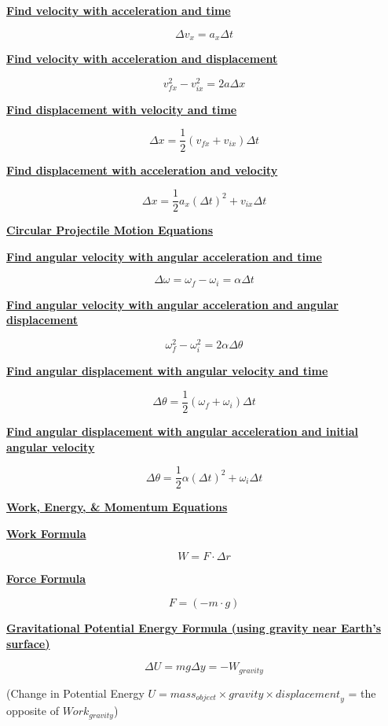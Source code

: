 \documentclass[12pt, letterpaper]{article}
\begin{document}
\normalsize{\centerline{\textbf{\underline{Find velocity with acceleration and time}}}}
\[\Delta v_x = a_x \Delta t\]

\centerline{\textbf{\underline{Find velocity with acceleration and displacement}}}
\[v^2_{fx} - v^2_{ix} = 2a \Delta x\]

\centerline{\textbf{\underline{Find displacement with velocity and time}}}
\[\Delta x = \frac{1}{2} (v_{fx} + v_{ix}) \Delta t\]

\centerline{\textbf{\underline{Find displacement with acceleration and velocity}}}
\[\Delta x = \frac{1}{2} a_x (\Delta t)^2 + v_{ix} \Delta t\]

\newpage

\Large{\centerline{\textbf{\underline{Circular Projectile Motion Equations}}}}
\vspace{1em}

\normalsize{\centerline{\textbf{\underline{Find angular velocity with angular acceleration and time}}}}
\[\Delta \omega = \omega_f - \omega_i = \alpha \Delta t\]

\centerline{\textbf{\underline{Find angular velocity with angular acceleration and angular displacement}}}
\[\omega^2_{f} - \omega^2_{i} = 2 \alpha \Delta \theta \]

\centerline{\textbf{\underline{Find angular displacement with angular velocity and time}}}
\[\Delta \theta = \frac{1}{2} (\omega_{f} + \omega_{i}) \Delta t\]

\centerline{\textbf{\underline{Find angular displacement with angular acceleration and initial angular velocity}}}
\[\Delta \theta = \frac{1}{2} \alpha (\Delta t)^2 + \omega_{i} \Delta t\]

\newpage


\Large{\centerline{\textbf{\underline{Work, Energy, \& Momentum Equations}}}}
\vspace{1em}

\normalsize{\centerline{\textbf{\underline{Work Formula}}}}
\[W = F \cdot \Delta r\]

\normalsize{\centerline{\textbf{\underline{Force Formula}}}}
\[F = (-m \cdot g)\]

\normalsize{\centerline{\textbf{\underline{Gravitational Potential Energy Formula (using gravity near Earth's surface)}}}}
\[\Delta U = mg \Delta y = -W_{gravity}\]
\small{\centerline{(Change in Potential Energy $U = {mass}_{object} \times {gravity} \times {displacement}_y$ = the opposite of ${Work}_{gravity}$)}}
\vspace{0.1em}
\end{document}

